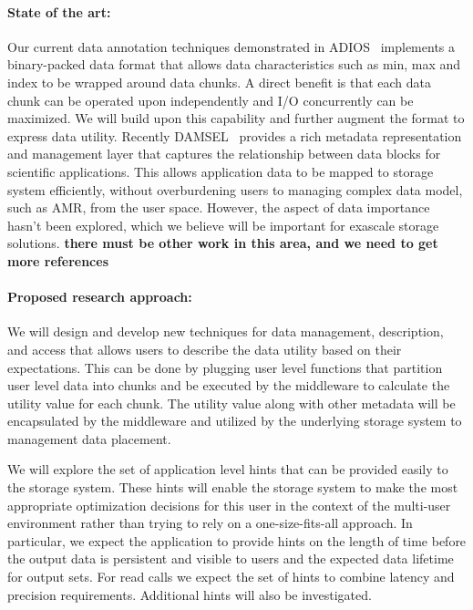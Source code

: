 \paragraph{State of the art:}
Our current data annotation techniques demonstrated in
ADIOS~\cite{lofstead:2009:adaptible} implements a binary-packed data format that
allows data characteristics such as min, max and index to be wrapped around
data chunks. A direct benefit is that each data chunk can be operated upon
independently and I/O concurrently can be maximized. We will build upon this
capability and further augment the format to express data utility.  Recently
DAMSEL~\cite{damsel} provides a rich metadata representation and management
layer that captures the relationship between data blocks for scientific
applications.  This allows application data to be mapped to storage system
efficiently, without overburdening users to managing complex data model, such
as AMR, from the user space. However, the aspect of data importance hasn't been
explored, which we believe will be important for exascale storage solutions.
{\color{red}\bf there must be other work in this area, and we need to get more
references}

\paragraph{Proposed research approach:} 
We will design and develop new techniques for data management, description,
and access that allows users to describe the data utility based on their
expectations. This can be done by plugging user level functions that
partition user level data into chunks and be executed by the middleware to
calculate the utility value for each chunk. The utility value along with other
metadata will be encapsulated by the middleware and utilized by the underlying
storage system to management data placement.
%

We will explore the set of application level hints that can be provided easily
to the storage system. These hints will enable the storage system to make the
most appropriate optimization decisions for this user in the context of the
multi-user environment rather than trying to rely on a one-size-fits-all
approach. In particular, we expect the application to provide hints on the
length of time before the output data is persistent and visible to users and
the expected data lifetime for output sets.  For read calls we expect the set
of hints to combine latency and precision requirements.  Additional hints will
also be investigated. 

